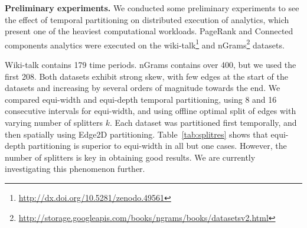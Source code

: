 {\bf Preliminary experiments.}  We conducted some preliminary
experiments to see the effect of temporal partitioning on distributed
execution of analytics, which present one of the heaviest
computational workloads.  PageRank and Connected components analytics
were executed on the wiki-talk\footnote{\url{http://dx.doi.org/10.5281/zenodo.49561}} and nGrams\footnote{\url{http://storage.googleapis.com/books/ngrams/books/datasetsv2.html}}
datasets.

Wiki-talk contains 179 time periods.  nGrams contains over 400, but we
used the first 208.  Both datasets exhibit strong skew, with few edges
at the start of the datasets and increasing by several orders of
magnitude towards the end.  We compared equi-width and equi-depth
temporal partitioning, using 8 and 16 consecutive intervals for
equi-width, and using offline optimal split of edges with varying
number of splitters $k$.  Each dataset was partitioned first
temporally, and then spatially using Edge2D partitioning.
Table~\ref{tab:splitres} shows that equi-depth partitioning is
superior to equi-width in all but one cases.  However, the number of
splitters is key in obtaining good results.  We are currently
investigating this phenomenon further.
